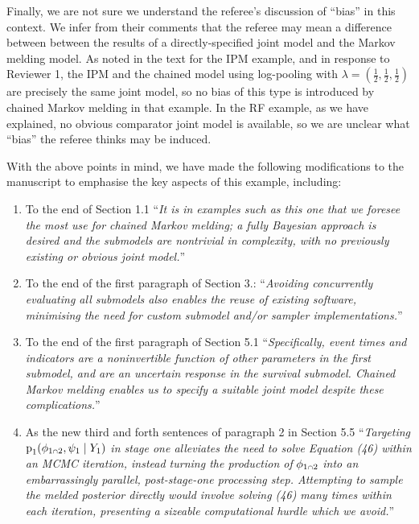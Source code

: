 \documentclass[
  10pt,
  a4paper,
]{article}
\providecommand{\tightlist}{%
  \setlength{\itemsep}{0pt}\setlength{\parskip}{0pt}}
\let\Oldcap\cap
\renewcommand{\cap}{\mathrel{\mathsmaller{\Oldcap}}}
\newcommand{\pd}{\text{p}}
\begin{document}
Finally, we are not sure we understand the referee's discussion of
``bias'' in this context. We infer from their comments that the referee
may mean a difference between between the results of a
directly-specified joint model and the Markov melding model. As noted in
the text for the IPM example, and in response to Reviewer 1, the IPM and
the chained model using log-pooling with
\(\lambda = (\frac{1}{2}, \frac{1}{2}, \frac{1}{2})\) are precisely the
same joint model, so no bias of this type is introduced by chained
Markov melding in that example. In the RF example, as we have explained,
no obvious comparator joint model is available, so we are unclear what
``bias'' the referee thinks may be induced.

With the above points in mind, we have made the following modifications
to the manuscript to emphasise the key aspects of this example,
including:

\begin{enumerate}
\def\labelenumi{\arabic{enumi}.}
\tightlist
\item
  To the end of Section 1.1 ``\emph{It is in examples such as this one
  that we foresee the most use for chained Markov melding; a fully
  Bayesian approach is desired and the submodels are nontrivial in
  complexity, with no previously existing or obvious joint model.}''
\item
  To the end of the first paragraph of Section 3.: ``\emph{Avoiding
  concurrently evaluating all submodels also enables the reuse of
  existing software, minimising the need for custom submodel and/or
  sampler implementations.}''
\item
  To the end of the first paragraph of Section 5.1 ``\emph{Specifically,
  event times and indicators are a noninvertible function of other
  parameters in the first submodel, and are an uncertain response in the
  survival submodel. Chained Markov melding enables us to specify a
  suitable joint model despite these complications.}''
\item
  As the new third and forth sentences of paragraph 2 in Section 5.5
  ``\emph{Targeting} \(\pd_{1}(\phi_{1 \cap 2}, \psi_{1} \mid Y_{1})\)
  \emph{in stage one alleviates the need to solve Equation (46) within
  an MCMC iteration, instead turning the production of}
  \(\phi_{1 \cap 2}\) \emph{into an embarrassingly parallel,
  post-stage-one processing step. Attempting to sample the melded
  posterior directly would involve solving (46) many times within each
  iteration, presenting a sizeable computational hurdle which we
  avoid.}''
\end{enumerate}
\end{document}
